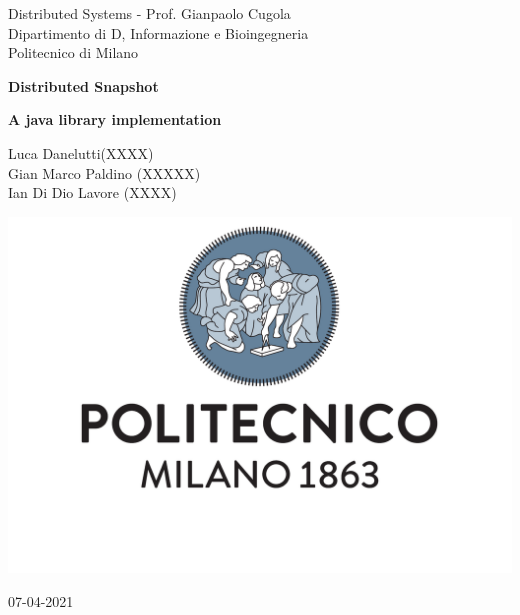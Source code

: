 \documentclass[a4paper]{article}
\begin{document}
    \begin{titlepage}
    	\centering
        {\normalsize 
            Distributed Systems - Prof. Gianpaolo Cugola \\ 
    		Dipartimento di D, Informazione e Bioingegneria \\
            Politecnico di Milano \par
        }     
        \vspace{3cm}
        {\Huge \textbf{Distributed Snapshot\\} }    
        \vspace{1cm}
        {\large \textbf{A java library implementation} \par}     
        \vspace{4cm}
    	{\normalsize Luca Danelutti(XXXX) \\ Gian Marco Paldino (XXXXX)\\ Ian Di Dio Lavore (XXXX)\par}     \vspace{3cm}
        \includegraphics[scale=0.4]{images/logo.pdf}
        \vspace{3cm}
    	{\normalsize 07-04-2021 \par}
    \end{titlepage}
    
    \tableofcontents

    

    \printbibliography
\end{document}
